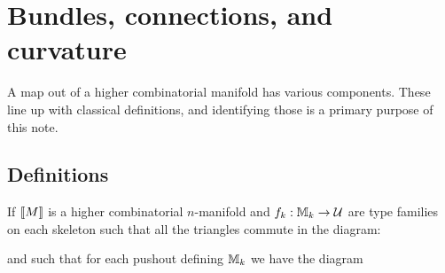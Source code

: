 \section{Bundles, connections, and curvature}
A map out of a higher combinatorial manifold has various components. These line up with classical definitions, and identifying those is a primary purpose of this note.

\subsection{Definitions}

\begin{mydef}
\label{def:connection}
If \( [\![{M}]\!] \) is a higher combinatorial \( n \)-manifold and \( f_k:\mathbb{M}_k\to\mathcal{U} \) are type families on each skeleton such that all the triangles commute in the diagram:
\end{mydef}
\begin{center}
\end{center}
and such that for each pushout defining \( \mathbb{M}_k \) we have the diagram
